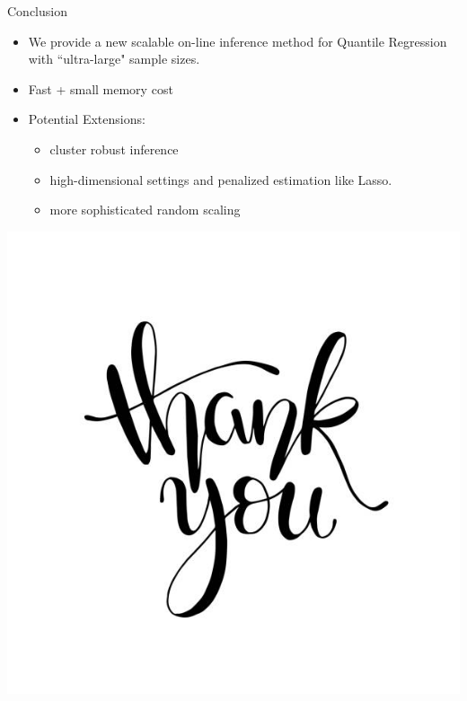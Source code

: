\documentclass[beamer, t]{beamer}
\newcommand{\fm}[1]{\begin{frame}#1\end{frame}}
\begin{document}
\begin{frame}{Conclusion} 
	\begin{itemize}
		
		\item We provide a new scalable on-line inference method for Quantile Regression with ``ultra-large" sample sizes. 
		
		\item Fast + small memory cost
		
		\item Potential Extensions:
		
		\begin{itemize}
			
			\item cluster robust inference
			
			\item high-dimensional settings and penalized estimation like Lasso.
			
			\item more sophisticated random scaling
			
			
			
		\end{itemize}
		
		
	\end{itemize} 
\end{frame}

\fm{
\vskip30pt
\centering
   \includegraphics[scale=1]{figures/thankyou.jpg}
}
\end{document}
